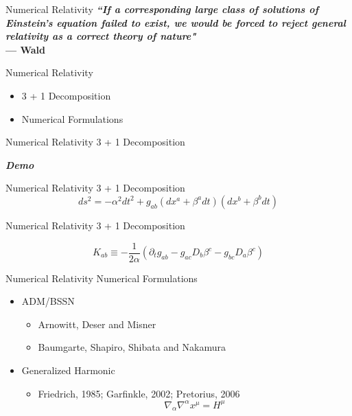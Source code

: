 \documentclass[xcolor=dvipsnames]{beamer}
\begin{document}
	\begin{frame}{Numerical Relativity}
		\textbf{\textit{``If a corresponding large class of solutions of Einstein's equation failed to exist, we would be forced to reject general relativity as a correct theory of nature"}}\\
		\hfill \textbf{--- Wald}
	\end{frame}
	\begin{frame}{Numerical Relativity}
		\begin{itemize}
			\item{3 + 1 Decomposition}
			\item{Numerical Formulations}
		\end{itemize}
	\end{frame}
	\begin{frame}{Numerical Relativity}
		3 + 1 Decomposition
		\begin{center}
			\Huge{\textbf{\textit{Demo}}}
		\end{center}
	\end{frame}
	\begin{frame}{Numerical Relativity}
		3 + 1 Decomposition
		\Large
		\[
		ds^{2} = - \alpha^{2}dt^{2} + g_{ab}(dx^{a} + \beta^{a}dt)(dx^{b} + \beta^{b}dt) 		
		\]
	\end{frame}
	\begin{frame}{Numerical Relativity}
		3 + 1 Decomposition
		\begin{center}
			\Large
			\[
			K_{ab} \equiv -\frac{1}{2\alpha}\left(\partial_{t}g_{ab} - g_{ac}D_{b}\beta^{c} - g_{bc}D_{a}\beta^{c}\right)
			\]
		\end{center}
	\end{frame}
	\begin{frame}{Numerical Relativity}
		Numerical Formulations
		\begin{itemize}
			\pause
			\item{ADM/BSSN}
			\pause
			\begin{itemize}
				\item{Arnowitt, Deser and Misner}
			\pause
				\item{Baumgarte, Shapiro, Shibata and Nakamura}
			\end{itemize}
			\pause
			\item{Generalized Harmonic}
			\pause
			\begin{itemize}
				\item{Friedrich, 1985; Garfinkle, 2002; Pretorius, 2006}\\
				\pause
				\[
				\nabla_{\alpha}\nabla^{\alpha}x^{\mu} = H^{\mu}
				\]
			\end{itemize}
		\end{itemize}
	\end{frame}
\end{document}
